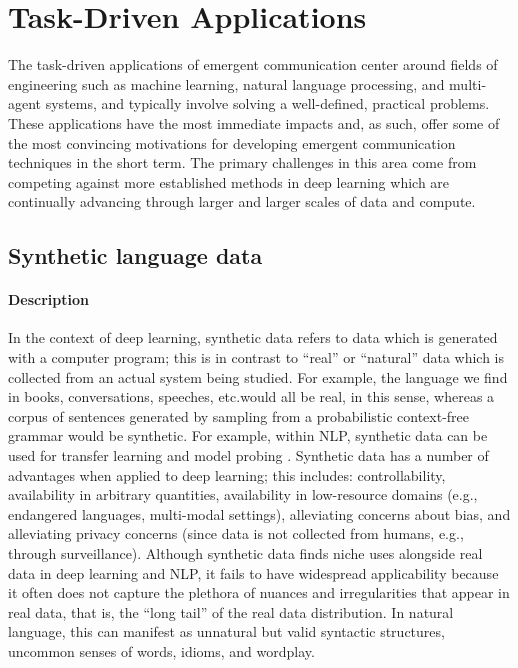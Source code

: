 \section{Task-Driven Applications}\label{sec:rev-task}

The task-driven applications of emergent communication center around fields of engineering such as machine learning, natural language processing, and multi-agent systems, and typically involve solving a well-defined, practical problems.
These applications have the most immediate impacts and, as such, offer some of the most convincing motivations for developing emergent communication techniques in the short term.
The primary challenges in this area come from competing against more established methods in deep learning which are continually advancing through larger and larger scales of data and compute.


\subsection{Synthetic language data}%
\label{sec:rev-synthetic}

\paragraph{Description}
In the context of deep learning, synthetic data refers to data which is generated with a computer program; this is in contrast to ``real''  or ``natural'' data which is collected from an actual system being studied.
For example, the language we find in books, conversations, speeches, etc.\@ would all be real, in this sense, whereas a corpus of sentences generated by sampling from a probabilistic context-free grammar would be synthetic.
For example, within NLP, synthetic data can be used for transfer learning \citep{Papadimitriou2020LearningMH,mirzaee-kordjamshidi-2022-transfer} and model probing \citep{lake2018generalization,zhang2022unveiling}.
Synthetic data has a number of advantages when applied to deep learning; this includes: controllability, availability in arbitrary quantities, availability in low-resource domains (e.g., endangered languages, multi-modal settings), alleviating concerns about bias, and alleviating privacy concerns (since data is not collected from humans, e.g., through surveillance).
Although synthetic data finds niche uses alongside real data in deep learning and NLP, it fails to have widespread applicability because it often does not capture the plethora of nuances and irregularities that appear in real data, that is, the ``long tail'' of the real data distribution.
In natural language, this can manifest as unnatural but valid syntactic structures, uncommon senses of words, idioms, and wordplay.

